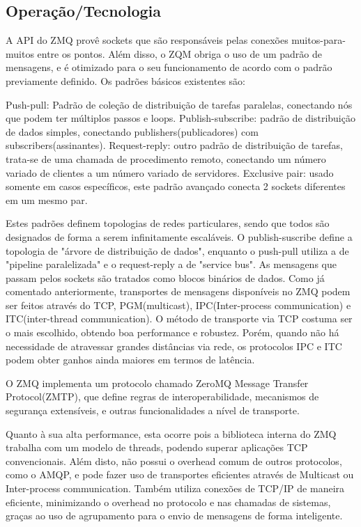 \documentclass[12pt]{article}
\begin{document}
\subsection{Operação/Tecnologia}
	A API do ZMQ provê sockets que são responsáveis pelas conexões muitos-para-muitos entre os pontos. Além disso, o ZQM obriga o uso de um padrão de mensagens, e é otimizado para o seu funcionamento de acordo com o padrão previamente definido. Os padrões básicos existentes são:

	Push-pull: Padrão de coleção de distribuição de tarefas paralelas, conectando nós que podem ter múltiplos passos e loops. Publish-subscribe: padrão de distribuição de dados simples, conectando publishers(publicadores) com subscribers(assinantes). Request-reply: outro padrão de distribuição de tarefas, trata-se de uma chamada de procedimento remoto, conectando um número variado de clientes a um número variado de servidores. Exclusive pair: usado somente em casos específicos, este padrão avançado conecta 2 sockets diferentes em um mesmo par.

	Estes padrões definem topologias de redes particulares, sendo que todos são designados de forma a serem infinitamente escaláveis. O publish-suscribe define a topologia de "árvore de distribuição de dados", enquanto o push-pull utiliza a de "pipeline paralelizada" e o request-reply a de "service bus". As mensagens que passam pelos sockets são tratados como blocos binários de dados. Como já comentado anteriormente, transportes de mensagens disponíveis no ZMQ podem ser feitos através do TCP, PGM(multicast), IPC(Inter-process communication) e ITC(inter-thread communication). O método de transporte via TCP costuma ser o mais escolhido, obtendo boa performance e robustez. Porém, quando não há necessidade de atravessar grandes distâncias via rede, os protocolos IPC e ITC podem obter ganhos ainda maiores em termos de latência. 
    
	O ZMQ implementa um protocolo chamado ZeroMQ Message Transfer Protocol(ZMTP), que define regras de interoperabilidade, mecanismos de segurança extensíveis, e outras funcionalidades a nível de transporte.

	Quanto à sua alta performance, esta ocorre pois a biblioteca interna do ZMQ trabalha com um modelo de threads, podendo superar aplicações TCP convencionais. Além disto, não possui o overhead comum de outros protocolos, como o AMQP, e pode fazer uso de transportes eficientes através de Multicast ou Inter-process communication. Também utiliza conexões de TCP/IP de maneira eficiente, minimizando o overhead no protocolo e nas chamadas de sistemas, graças ao uso de agrupamento para o envio de mensagens de forma inteligente.
\end{document}
